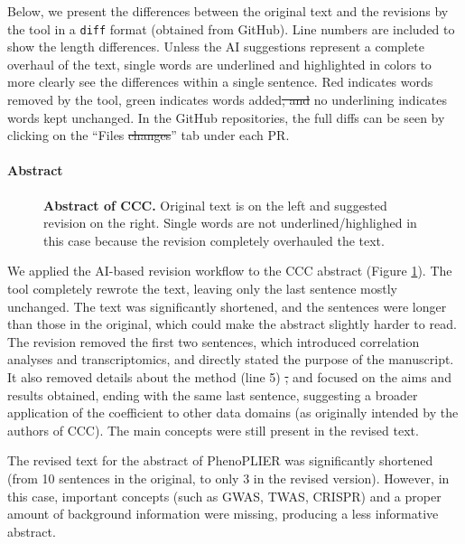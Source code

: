\documentclass[
]{article}
\providecommand{\DIFaddtex}[1]{{\protect\color{blue}\uwave{#1}}} %
\providecommand{\DIFdeltex}[1]{{\protect\color{red}\sout{#1}}}                      %
\providecommand{\DIFaddbegin}{} %
\providecommand{\DIFaddend}{} %
\providecommand{\DIFdelbegin}{} %
\providecommand{\DIFdelend}{} %
\providecommand{\DIFadd}[1]{\texorpdfstring{\DIFaddtex{#1}}{#1}} %
\providecommand{\DIFdel}[1]{\texorpdfstring{\DIFdeltex{#1}}{}} %
\newcommand{\DIFscaledelfig}{0.5}
\newlength{\DIFdelgraphicswidth} %
\newlength{\DIFdelgraphicsheight} %
\newcommand{\DIFaddincludegraphics}[2][]{{\color{blue}\fbox{\DIFOincludegraphics[#1]{#2}}}} %
\newcommand{\DIFdelincludegraphics}[2][]{%
\sbox{\DIFdelgraphicsbox}{\DIFOincludegraphics[#1]{#2}}%
\settoboxwidth{\DIFdelgraphicswidth}{\DIFdelgraphicsbox} %
\settoboxtotalheight{\DIFdelgraphicsheight}{\DIFdelgraphicsbox} %
\scalebox{\DIFscaledelfig}{%
\parbox[b]{\DIFdelgraphicswidth}{\usebox{\DIFdelgraphicsbox}\\[-\baselineskip] \rule{\DIFdelgraphicswidth}{0em}}\llap{\resizebox{\DIFdelgraphicswidth}{\DIFdelgraphicsheight}{%
\setlength{\unitlength}{\DIFdelgraphicswidth}%
\begin{picture}(1,1)%
\thicklines\linethickness{2pt} %
{\color[rgb]{1,0,0}\put(0,0){\framebox(1,1){}}}%
{\color[rgb]{1,0,0}\put(0,0){\line( 1,1){1}}}%
{\color[rgb]{1,0,0}\put(0,1){\line(1,-1){1}}}%
\end{picture}%
}\hspace*{3pt}}} %
} %
\DeclareRobustCommand{\DIFaddbegin}{\DIFOaddbegin \let\includegraphics\DIFaddincludegraphics} %
\DeclareRobustCommand{\DIFaddend}{\DIFOaddend \let\includegraphics\DIFOincludegraphics} %
\DeclareRobustCommand{\DIFdelbegin}{\DIFOdelbegin \let\includegraphics\DIFdelincludegraphics} %
\DeclareRobustCommand{\DIFdelend}{\DIFOaddend \let\includegraphics\DIFOincludegraphics} %
\begin{document}
Below, we present the differences between the original text and the revisions \DIFaddbegin \DIFadd{made }\DIFaddend by the tool in a \texttt{diff} format (obtained from GitHub).
Line numbers are included to show the length differences.
Unless the AI suggestions represent a complete overhaul of the text, single words are underlined and highlighted in colors to more clearly see the differences within a single sentence.
Red indicates words removed by the tool, \DIFaddbegin \DIFadd{while }\DIFaddend green indicates words added\DIFdelbegin \DIFdel{, and }\DIFdelend \DIFaddbegin \DIFadd{; }\DIFaddend no underlining indicates words kept unchanged.
In the GitHub repositories, the full diffs can be seen by clicking on the ``Files \DIFdelbegin \DIFdel{changes}\DIFdelend \DIFaddbegin \DIFadd{changed}\DIFaddend '' tab under each PR.

\paragraph{Abstract}

\begin{figure}
\hypertarget{fig:abstract:ccc}{%
\centering

\caption{\textbf{Abstract of CCC.}
Original text is on the left and suggested revision on the right.
Single words are not underlined/highlighed in this case because the revision completely overhauled the text.}\label{fig:abstract:ccc}
}
\end{figure}

We applied the AI-based revision workflow to the CCC abstract (Figure \ref{fig:abstract:ccc}).
The tool completely rewrote the text, leaving only the last sentence mostly unchanged.
The text was significantly shortened, and the sentences were longer than those in the original, which could make the abstract slightly harder to read.
The revision removed the first two sentences, which introduced correlation analyses and transcriptomics, and directly stated the purpose of the manuscript.
It also removed details about the method (line 5) \DIFdelbegin \DIFdel{, }\DIFdelend and focused on the aims and results obtained, ending with the same last sentence, suggesting a broader application of the coefficient to other data domains (as originally intended by the authors of CCC).
The main concepts were still present in the revised text.

The revised text for the abstract of PhenoPLIER was significantly shortened (from 10 sentences in the original, to only 3 in the revised version).
However, in this case, important concepts (such as GWAS, TWAS, CRISPR) and a proper amount of background information were missing, producing a less informative abstract.
\end{document}
